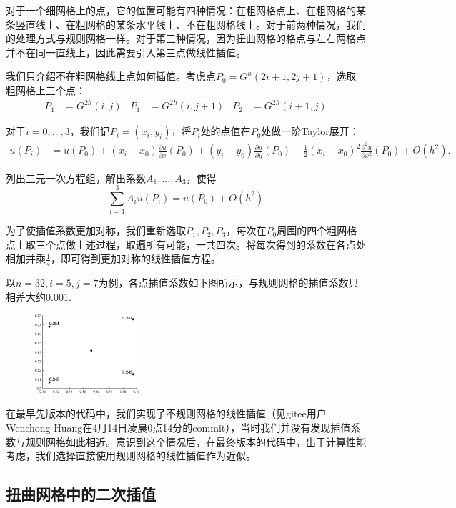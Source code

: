 \documentclass[lang=cn,10pt]{elegantbook}
\begin{document}
对于一个细网格上的点，它的位置可能有四种情况：在粗网格点上、在粗网格的某条竖直线上、在粗网格的某条水平线上、不在粗网格线上。对于前两种情况，我们的处理方式与规则网格一样。对于第三种情况，因为扭曲网格的格点与左右两格点并不在同一直线上，因此需要引入第三点做线性插值。

我们只介绍不在粗网格线上点如何插值。考虑点$P_0=G^h(2i+1,2j+1)$，选取粗网格上三个点：
\begin{align*}
  P_1&=G^{2h}(i,j) & P_1&=G^{2h}(i,j+1) & P_2&=G^{2h}(i+1,j)
\end{align*}

对于$i=0,...,3$，我们记$P_i=(x_i,y_i)$，将$P_i$处的点值在$P_0$处做一阶Taylor展开：
\begin{align*}
  u(P_i)&=u(P_0)+(x_i-x_0)\frac{\partial u}{\partial x}(P_0)+(y_i-y_0)\frac{\partial u}{\partial y}(P_0)
  +\frac{1}{2}(x_i-x_0)^2\frac{\partial^2 u}{\partial x^2}(P_0) + O(h^2).
\end{align*}

列出三元一次方程组，解出系数$A_1,...,A_3$，使得
\begin{equation*}
  \sum_{i=1}^3 A_iu(P_i)=u(P_0)+O(h^2)
\end{equation*}

为了使插值系数更加对称，我们重新选取$P_1,P_2,P_3$，每次在$P_0$周围的四个粗网格点上取三个点做上述过程，取遍所有可能，一共四次。将每次得到的系数在各点处相加并乘$\frac{1}{4}$，即可得到更加对称的线性插值方程。

以$n=32,i=5,j=7$为例，各点插值系数如下图所示，与规则网格的插值系数只相差大约$0.001$.
\begin{figure}[H]
  \centering
  \includegraphics[width=0.35\textwidth]{figure/3-5.eps}
\end{figure}

在最早先版本的代码中，我们实现了不规则网格的线性插值（见gitee用户Wenchong Huang在4月14日凌晨0点14分的commit），当时我们并没有发现插值系数与规则网格如此相近。意识到这个情况后，在最终版本的代码中，出于计算性能考虑，我们选择直接使用规则网格的线性插值作为近似。

\subsection{扭曲网格中的二次插值}
\end{document}
